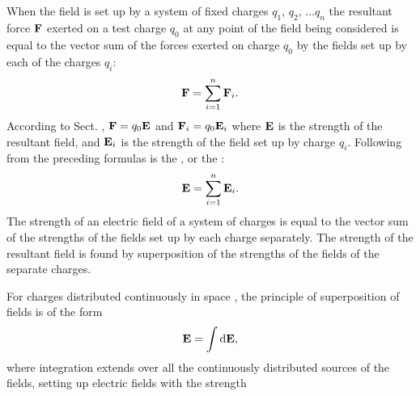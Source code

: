 \subsection{}\label{15.2.2} When the field is set up by a system of fixed charges $q_{1},\,q_{2},\, \ldots{} q_{n}$ the resultant force $\vb{F}$ exerted on a test charge $q_{0}$  at any point of the field being considered is equal to the vector sum of the forces exerted on charge $q_{0}$ by the fields set up by each of the charges $q_{i}$:
\begin{equation*}%
\vb{F} = \sum_{i=1}^{n} \vb{F}_{i}.
\end{equation*}
According to Sect. , $\vb{F} = q_{0} \vb{E}$ and $\vb{F}_{i} = q_{0} \vb{E}_{i}$ where $\vb{E}$ is the strength of the resultant field, and $\vb{E}_{i}$ is the strength of the field set up by charge $q_{i}$. Following from the preceding formulas is the , or the :
\begin{equation*}%
\vb{E} = \sum_{i=1}^{n} \vb{E}_{i}.
\end{equation*}
The strength of an electric field of a system of charges is equal to the vector sum of the strengths of the fields set up by each charge separately. The strength of the resultant field is found by superposition of the strengths of the fields of the separate charges.

For charges distributed continuously in space , the principle of superposition of fields is of the form
\begin{equation*}%
\vb{E} = \int \dd \vb{E},
\end{equation*}
where integration extends over all the continuously distributed sources of the fields, setting up electric fields with the strength


